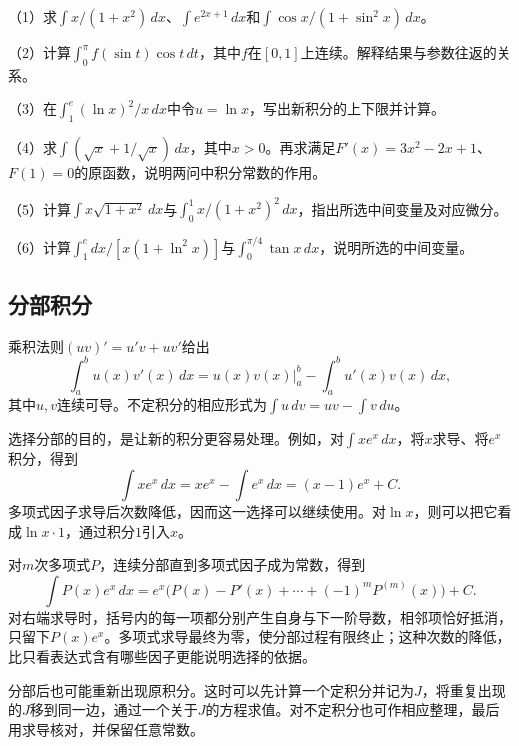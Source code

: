 \begin{exercise}
\mbox{}\par\nobreak

（1）求\(\int x/(1+x^2)\,dx\)、\(\int e^{2x+1}\,dx\)和\(\int\cos x/(1+\sin^2x)\,dx\)。

（2）计算\(\int_0^\pi f(\sin t)\cos t\,dt\)，其中\(f\)在\([0,1]\)上连续。解释结果与参数往返的关系。

（3）在\(\int_1^e(\ln x)^2/x\,dx\)中令\(u=\ln x\)，写出新积分的上下限并计算。

（4）求\(\int(\sqrt{x}+1/\sqrt{x})\,dx\)，其中\(x>0\)。再求满足\(F'(x)=3x^2-2x+1\)、\(F(1)=0\)的原函数，说明两问中积分常数的作用。

（5）计算\(\int x\sqrt{1+x^2}\,dx\)与\(\int_0^1x/(1+x^2)^2\,dx\)，指出所选中间变量及对应微分。

（6）计算\(\int_1^e dx/[x(1+\ln^2x)]\)与\(\int_0^{\pi/4}\tan x\,dx\)，说明所选的中间变量。
\end{exercise}

\subsection{分部积分}

乘积法则\((uv)'=u'v+uv'\)给出
\begin{equation}\label{eq:calculus-integration-by-parts}
 \int_a^b u(x)v'(x)\,dx
 =\left.u(x)v(x)\right|_a^b-\int_a^b u'(x)v(x)\,dx,
\end{equation}
其中\(u,v\)连续可导。不定积分的相应形式为\(\int u\,dv=uv-\int v\,du\)。

选择分部的目的，是让新的积分更容易处理。例如，对\(\int x e^x\,dx\)，将\(x\)求导、将\(e^x\)积分，得到
\begin{equation*}
 \int x e^x\,dx=xe^x-\int e^x\,dx=(x-1)e^x+C.
\end{equation*}
多项式因子求导后次数降低，因而这一选择可以继续使用。对\(\ln x\)，则可以把它看成\(\ln x\cdot1\)，通过积分\(1\)引入\(x\)。

对\(m\)次多项式\(P\)，连续分部直到多项式因子成为常数，得到
\begin{equation*}
 \int P(x)e^x\,dx
 =e^x\bigl(P(x)-P'(x)+\cdots+(-1)^mP^{(m)}(x)\bigr)+C.
\end{equation*}
对右端求导时，括号内的每一项都分别产生自身与下一阶导数，相邻项恰好抵消，只留下\(P(x)e^x\)。多项式求导最终为零，使分部过程有限终止；这种次数的降低，比只看表达式含有哪些因子更能说明选择的依据。

分部后也可能重新出现原积分。这时可以先计算一个定积分并记为\(J\)，将重复出现的\(J\)移到同一边，通过一个关于\(J\)的方程求值。对不定积分也可作相应整理，最后用求导核对，并保留任意常数。

